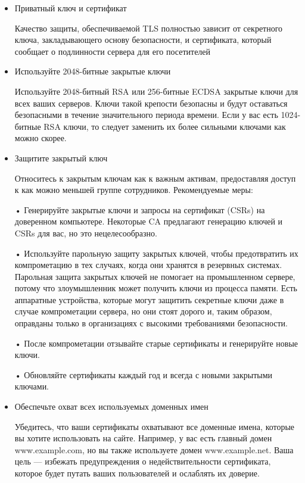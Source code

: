 \documentclass[11pt, a4paper]{article}		%
\begin{document}
\begin{itemize}

\item Приватный ключ и сертификат

Качество защиты, обеспечиваемой TLS полностью зависит от секретного ключа, закладывающего основу безопасности, и сертификата, который сообщает о подлинности сервера для его посетителей

\item Используйте 2048-битные закрытые ключи

Используйте 2048-битный RSA или 256-битные ECDSA закрытые ключи для всех ваших серверов. Ключи такой крепости безопасны и будут оставаться безопасными в течение значительного периода времени. Если у вас есть 1024-битные RSA ключи, то следует заменить их более сильными ключами как можно скорее.

\item Защитите закрытый ключ

Относитесь к закрытым ключам как к важным активам, предоставляя доступ к как можно меньшей группе сотрудников. Рекомендуемые меры:

• Генерируйте закрытые ключи и запросы на сертификат (CSRs) на доверенном компьютере. Некоторые CA предлагают генерацию ключей и CSRs для вас, но это нецелесообразно.

• Используйте парольную защиту закрытых ключей, чтобы предотвратить их компрометацию в тех случаях, когда они хранятся в резервных системах. Парольная защита закрытых ключей не помогает на промышленном сервере, потому что злоумышленник может получить ключи из процесса памяти. Есть аппаратные устройства, которые могут защитить секретные ключи даже в случае компрометации сервера, но они стоят дорого и, таким образом, оправданы только в организациях с высокими требованиями безопасности.

• После компрометации отзывайте старые сертификаты и генерируйте новые ключи.

• Обновляйте сертификаты каждый год и всегда с новыми закрытыми ключами.

\item Обеспечьте охват всех используемых доменных имен

Убедитесь, что ваши сертификаты охватывают все доменные имена, которые вы хотите использовать на сайте. Например, у вас есть главный домен www.example.com, но вы также используете домен www.example.net. Ваша цель — избежать предупреждения о недействительности сертификата, которое будет путать ваших пользователей и ослаблять их доверие. 


\end{itemize}
\end{document}
